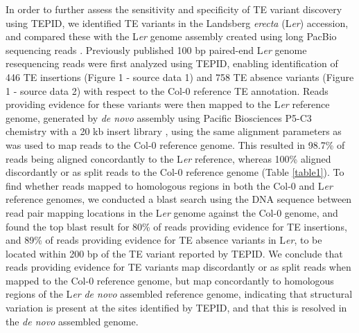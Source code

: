 \documentclass[12pt]{article}
\begin{document}
In order to further assess the sensitivity and specificity of TE variant
discovery using TEPID, we identified TE variants in the Landsberg
\emph{erecta} (L\emph{er}) accession, and compared these with the
L\emph{er }genome assembly created using long PacBio sequencing reads
\cite{Chin:2013iw}. Previously published 100 bp paired-end L\emph{er}
genome resequencing reads \cite{Schneeberger:2011ft} were first analyzed
using TEPID, enabling identification of 446 TE insertions (Figure 1 -
source data 1) and 758 TE absence variants (Figure 1 - source data 2)
with respect to the Col-0 reference TE annotation. Reads providing
evidence for these variants were then mapped to the L\emph{er} reference
genome, generated by \emph{de novo} assembly using Pacific
Biosciences P5-C3 chemistry with a 20 kb insert library
\cite{Chin:2013iw}, using the same alignment parameters as was used to
map reads to the Col-0 reference genome. This resulted in 98.7\% of
reads being aligned concordantly to the L\emph{er} reference, whereas
100\% aligned discordantly or as split reads to the Col-0 reference
genome (Table \ref{table1}). To find whether reads mapped to homologous regions in
both the Col-0 and L\emph{er} reference genomes, we conducted a blast
search \cite{Camacho:2009fc} using the DNA sequence between read pair
mapping locations in the L\emph{er }genome against the Col-0 genome, and
found the top blast result for 80\% of reads providing evidence for TE
insertions, and 89\% of reads providing evidence for TE absence variants
in L\emph{er}, to be located within 200 bp of the TE variant
reported by TEPID. We conclude that reads providing evidence for TE
variants map discordantly or as split reads when mapped to the Col-0
reference genome, but map concordantly to homologous regions of the
L\emph{er} \emph{de novo} assembled reference genome, indicating that
structural variation is present at the sites identified by TEPID, and
that this is resolved in the \emph{de novo} assembled genome.
\end{document}

